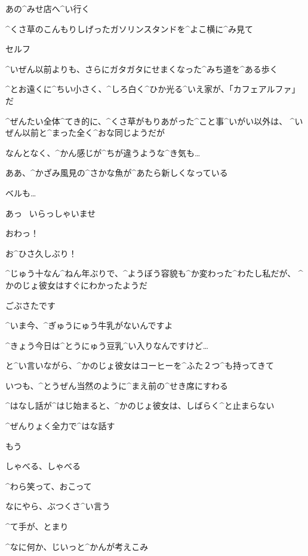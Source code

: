 \page[58]
\Narrator あの^{みせ}{店}へ^{い}{行}く

\page[59]
\Narrator ^{くさ}{草}のこんもりしげったガソリンスタンドを^{よこ}{横}に^{み}{見}て

\Sign セルフ

\Narrator ^{いぜん}{以前}よりも、さらにガタガタにせまくなった^{みち}{道}を^{ある}{歩}く

\page[60]
\Narrator ^{とお}{遠}くに^{ちい}{小}さく、^{しろ}{白}く^{ひか}{光}る^{いえ}{家}が、「カフェアルファ」だ

\Narrator ^{ぜんたい}{全体}^{てき}{的}に、^{くさ}{草}がもりあがった^{こと}{事}^{いがい}{以外}は、
^{いぜん}{以前}と^{まった}{全}く^{おな}{同}じようだが

\Narrator なんとなく、^{かん}{感}じが^{ちが}{違}うような^{き}{気}も…

\page[61]
\Narrator ああ、^{かざみ}{風見}の^{さかな}{魚}が^{あたら}{新}しくなっている

\Narrator ベルも…

\page[62]
\Alpha あっ
\ いらっしゃいませ

\Alpha おわっ！

\Alpha お^{ひさ}{久}しぶり！

\Narrator ^{じゅう}{十}なん^{ねん}{年}ぶりで、^{ようぼう}{容貌}も^{か}{変}わった^{わたし}{私}だが、
^{かのじょ}{彼女}はすぐにわかったようだ

\Alpha ごぶさたです

\page[63]
\Alpha ^{いま}{今}、^{ぎゅうにゅう}{牛乳}がないんですよ

\Alpha ^{きょう}{今日}は^{とうにゅう}{豆乳}^{い}{入}りなんですけど…

\Narrator と^{い}{言}いながら、^{かのじょ}{彼女}はコーヒーを^{ふた}{２}つ^{も}{持}ってきて

\Narrator いつも、^{とうぜん}{当然}のように^{まえ}{前}の^{せき}{席}にすわる

\page[65]
\Narrator ^{はなし}{話}が^{はじ}{始}まると、^{かのじょ}{彼女}は、しばらく^{と}{止}まらない

\Narrator ^{ぜんりょく}{全力}で^{はな}{話}す

\Narrator もう

\Narrator しゃべる、しゃべる

\page[66]
\Narrator ^{わら}{笑}って、おこって

\Narrator なにやら、ぶつくさ^{い}{言}う

\page[67]
\Narrator ^{て}{手}が、とまり

\page[68]
\Narrator ^{なに}{何}か、じいっと^{かんが}{考}えこみ

